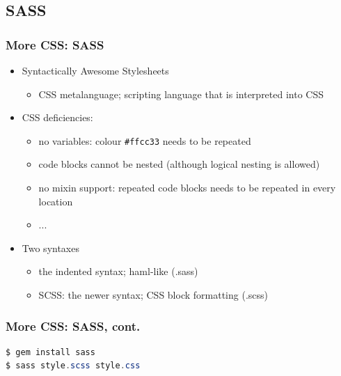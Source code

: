 \documentclass{beamer}
\begin{document}
\subsection{SASS}
\begin{frame}[fragile]\frametitle{More CSS: SASS} 

  \begin{itemize}
    \item Syntactically Awesome Stylesheets
    \begin{itemize}
      \item CSS metalanguage; scripting language that is interpreted into CSS
    \end{itemize}
    \item CSS deficiencies:
    \begin{itemize}
      \item no variables: colour \texttt{\#ffcc33} needs to be repeated
      \item code blocks cannot be nested (although logical nesting is allowed)
      \item no mixin support: repeated code blocks needs to be repeated in every location
      \item ...
    \end{itemize}     
    \item Two syntaxes
    \begin{itemize}
      \item the indented syntax; haml-like (.sass)
      \item SCSS: the newer syntax; CSS block formatting (.scss)
    \end{itemize}
  \end{itemize}

\end{frame}



\begin{frame}[fragile]\frametitle{More CSS: SASS, cont.} 

  \begin{lstlisting}[language=java, escapechar={^}]
$ gem install sass
$ sass style.scss style.css
  \end{lstlisting}
  
  \begin{columns}[c] 

    \begin{column}{5.5cm}
      
    \end{column}  

    \begin{column}{5.5cm}
      
    \end{column}    
    
  \end{columns}
  
\end{frame}
\end{document}
